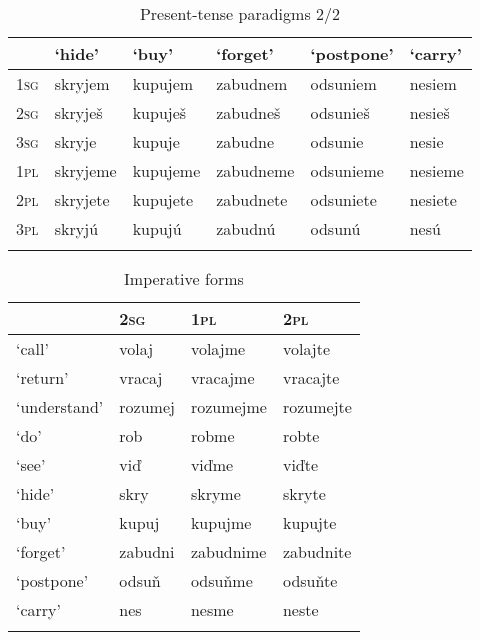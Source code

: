 \documentclass[output=paper,colorlinks,citecolor=brown]{langscibook}
\begin{document}
\begin{table}
\caption{Present-tense paradigms 2/2}
\label{tab:pitsch:2}
 \begin{tabular}{llllll}
  \lsptoprule
            & `hide' & `buy' & `forget' & `postpone' & `carry' \\
  \midrule
  \textsc{1sg} & skryjem & kupujem & zabudnem & odsuniem & nesiem \\
  \textsc{2sg} & skryješ & kupuješ & zabudneš & odsunieš & nesieš \\
  \textsc{3sg} & skryje & kupuje & zabudne & odsunie & nesie \\
  \textsc{1pl} & skryjeme & kupujeme & zabudneme & odsunieme & nesieme \\
  \textsc{2pl} & skryjete & kupujete & zabudnete & odsuniete & nesiete \\
  \textsc{3pl} & skryjú & kupujú & zabudnú & odsunú & nesú \\
  \lspbottomrule
 \end{tabular}
\end{table}


\begin{table}
\caption{Imperative forms}
\label{tab:pitsch:3}
 \begin{tabular}{llll}
  \lsptoprule
  & \textsc{2sg} & \textsc{1pl} & \textsc{2pl} \\
  \midrule
  `call' & volaj & volajme & volajte \\
  `return' & vracaj & vracajme & vracajte \\
  `understand' & rozumej & rozumejme & rozumejte \\
  `do' & rob & robme & robte \\
  `see' & viď & viďme & viďte \\
  `hide' & skry & skryme & skryte \\
  `buy' & kupuj & kupujme & kupujte \\
  `forget' & zabudni & zabudnime & zabudnite \\
  `postpone' & odsuň & odsuňme & odsuňte \\
  `carry' & nes & nesme & neste \\
  \lspbottomrule
 \end{tabular}
\end{table}

\end{document}
